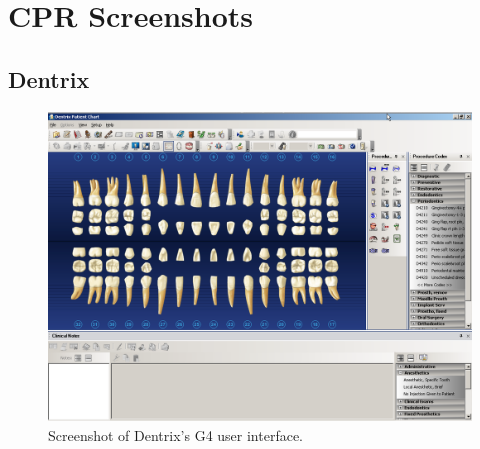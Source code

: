 \documentclass[11pt]{article}
\begin{document}
\footnotesize{
}
\newpage

\addappheadtotoc
\appendix


\section{CPR Screenshots}
\label{SS}
\subsection{Dentrix}
\label{dentrixplain}

\begin{figure}[h]
\begin{center}
\includegraphics[width=\textwidth]{dentrixss1.png}
\end{center}
\caption{Screenshot of Dentrix's G4 user interface.}
\end{figure}

\newpage
\end{document}
